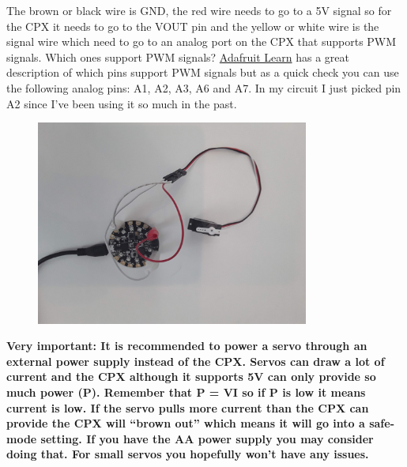 The brown or black wire is GND, the red wire needs to go to a 5V signal so for the CPX it needs to go to the VOUT pin and the yellow or white wire is the signal wire which need to go to an analog port on the CPX that supports PWM signals. Which ones support PWM signals? \href{https://learn.adafruit.com/adafruit-circuit-playground-express/pinouts}{Adafruit Learn} has a great description of which pins support PWM signals but as a quick check you can use the following analog pins: A1, A2, A3, A6 and A7. In my circuit I just picked pin A2 since I’ve been using it so much in the past.
\begin{figure}[H]
  \begin{center}
    \includegraphics[width=0.8\textwidth]{Figures/servo_circuit.jpeg}
  \end{center}
\end{figure}
{\bf Very important: It is recommended to power a servo through an external power supply instead of the CPX. Servos can draw a lot of current and the CPX although it supports 5V can only provide so much power (P). Remember that P = VI so if P is low it means current is low. If the servo pulls more current than the CPX can provide the CPX will “brown out” which means it will go into a safe-mode setting. If you have the AA power supply you may consider doing that. For small servos you hopefully won’t have any issues.}

